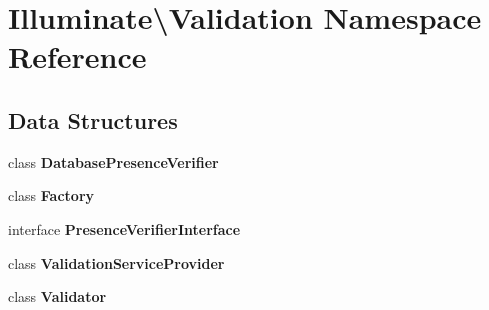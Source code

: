 \section{Illuminate\textbackslash{}Validation Namespace Reference}
\label{namespace_illuminate_1_1_validation}
\subsection*{Data Structures}
\begin{DoxyCompactItemize}
\item 
class {\bf Database\+Presence\+Verifier}
\item 
class {\bf Factory}
\item 
interface {\bf Presence\+Verifier\+Interface}
\item 
class {\bf Validation\+Service\+Provider}
\item 
class {\bf Validator}
\end{DoxyCompactItemize}
